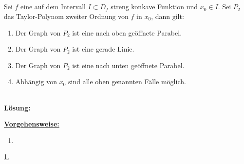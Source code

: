 \subsection*{}
Sei $f$ eine auf dem Intervall $I \subset D_f$ streng konkave Funktion und $x_0 \in I$. Sei $P_2 $ das Taylor-Polynom zweiter Ordnung von $f$ in $x_0$, dann gilt:
\renewcommand{\labelenumi}{(\alph{enumi})}
\begin{enumerate}
	\item 
	Der Graph von $P_2$ ist eine nach oben geöffnete Parabel.
	\item
	Der Graph von $P_2$ ist eine gerade Linie.
	\item
	Der Graph von $P_2$ ist eine nach unten geöffnete Parabel.
	\item
	Abhängig von $x_0$ sind alle oben genannten Fälle möglich.
\end{enumerate}
\ \\
\textbf{Lösung:}
\begin{mdframed}
	\underline{\textbf{Vorgehensweise:}}
	\renewcommand{\labelenumi}{\theenumi.}
	\begin{enumerate}
		\item 
	\end{enumerate}
\end{mdframed}

\underline{1. }\\


